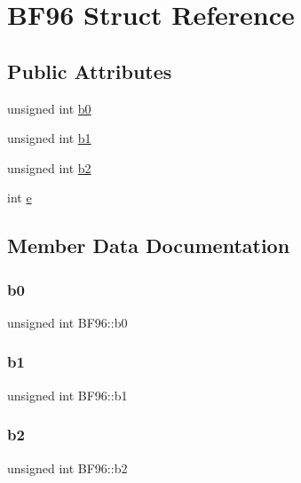 \hypertarget{struct_b_f96}{}\section{B\+F96 Struct Reference}
\label{struct_b_f96}
\subsection*{Public Attributes}
\begin{DoxyCompactItemize}
\item 
unsigned int \hyperlink{struct_b_f96_ac2e6f790d4f22cd59526c7286e2f9f4f}{b0}
\item 
unsigned int \hyperlink{struct_b_f96_af93c89e8a7821eb100c5efaada4f8283}{b1}
\item 
unsigned int \hyperlink{struct_b_f96_a82ff6b29a5899a12abac18f9666ed870}{b2}
\item 
int \hyperlink{struct_b_f96_a204f2f5a2bd7cd95dde8d04f777c0048}{e}
\end{DoxyCompactItemize}


\subsection{Member Data Documentation}
\mbox{\label{struct_b_f96_ac2e6f790d4f22cd59526c7286e2f9f4f}} 
\subsubsection{\texorpdfstring{b0}{b0}}
{\footnotesize\ttfamily unsigned int B\+F96\+::b0}

\mbox{\label{struct_b_f96_af93c89e8a7821eb100c5efaada4f8283}} 
\subsubsection{\texorpdfstring{b1}{b1}}
{\footnotesize\ttfamily unsigned int B\+F96\+::b1}

\mbox{\label{struct_b_f96_a82ff6b29a5899a12abac18f9666ed870}} 
\subsubsection{\texorpdfstring{b2}{b2}}
{\footnotesize\ttfamily unsigned int B\+F96\+::b2}

